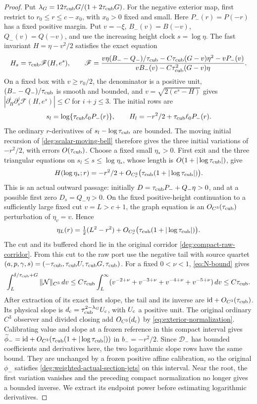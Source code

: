 \begin{proof}
Put \(\lambda_G=12\tau_{\rm cub} G/(1+2\tau_{\rm cub} G)\).
For the negative exterior map, first restrict to
\(r_0\le r\le c-x_0\), with \(x_0>0\) fixed and small.
Here \(P_-(r)=P(-r)\) has a fixed positive margin. Put \(v=-\xi\),
\(B_-(v)=B(-v)\), \(Q_-(v)=Q(-v)\), and use the increasing
height clock \(s=\log\eta\). The fast invariant
\(H=\eta-v^2/2\) satisfies the exact equation
\[
 H_s=\tau_{\rm cub}\mathscr F(H,e^s),\qquad
 \mathscr F=
 \frac{v\eta(B_--Q_-)/\tau_{\rm cub}
       -C\tau_{\rm cub}(G-v)\eta^2-vP_-(v)}
      {vB_-(v)-C\tau_{\rm cub}^2(G-v)\eta}.
\]
On a fixed box with \(v\ge r_0/2\), the denominator is a positive
unit, \((B_--Q_-)/\tau_{\rm cub}\) is smooth and bounded, and
\(v=\sqrt{2(e^s-H)}\) gives
\( |\partial_H^i\partial_s^j\mathscr F(H,e^s)|\le C\)
for \(i+j\le3\). The initial rows are
\[
 s_l=\log\{\tau_{\rm cub}\ell_0P_-(r)\},\qquad
 H_l=-r^2/2+\tau_{\rm cub}\ell_0P_-(r).
\]
The ordinary \(r\)-derivatives of \(s_l-\log\tau_{\rm cub}\) are bounded.
The moving initial recursion of
\eqref{deg:scalar-moving-bell} therefore gives the three initial
variations of \(-r^2/2\), with errors \(O(\tau_{\rm cub})\).
Choose a fixed small \(\eta_*>0\). First exit and the three
triangular equations on
\(s_l\le s\le\log\eta_*\), whose length is
\(O(1+|\log\tau_{\rm cub}|)\), give
\[
 H(\log\eta_*;r)=-r^2/2+
          O_{C^3_r}\bigl(\tau_{\rm cub}(1+|\log\tau_{\rm cub}|)\bigr).
\]
This is an actual outward passage: initially
\(D=\tau_{\rm cub} P_-+Q_-\eta>0\), and at a possible first zero
\(D_s=Q_-\eta>0\). On the fixed positive-height continuation
to a sufficiently large fixed cut \(v=L>c+1\), the graph equation
is an \(O_{C^3}(\tau_{\rm cub})\) perturbation of \(\eta_v=v\). Hence
\[
 \eta_L(r)=\tfrac12(L^2-r^2)+
          O_{C^3_r}\bigl(\tau_{\rm cub}(1+|\log\tau_{\rm cub}|)\bigr).
\]
The cut and its buffered chord lie in the original corridor
\eqref{deg:compact-raw-corridor}. From this cut to the raw port use
the negative tail with source quartet
\((a,p,\gamma,s)=(-\tau_{\rm cub},\tau_{\rm cub} U,\tau_{\rm cub} G,\tau_{\rm cub})\).
For a fixed \(0<\nu<1\), \eqref{eq:N-bound} gives
\[
 \int_L^{\delta/\tau_{\rm cub}+G}\|\mathcal N\|_{C^3}\,dv
 \le C\tau_{\rm cub}\int_L^\infty
 (v^{-2+\nu}+v^{-3+\nu}+v^{-4+\nu}+v^{-5+\nu})\,dv
 \le C\tau_{\rm cub}.
\]
After extraction of its exact first slope, the tail and its inverse
are \(\mathrm{id}+O_{C^3}(\tau_{\rm cub})\). Its physical slope is
\(d_{\rm c}=\tau_{\rm cub}^{2-\lambda_G}U_{\rm c}\), with
\(U_{\rm c}\) a positive unit. The original ordinary \(C^3\)
observer and divided closing add \(O_{C^3}(d_{\rm c})\) by
\eqref{eq:exterior-normalization}. Calibrating value and slope at a
frozen reference in this compact interval gives
\(\widetilde\phi_-=\mathrm{id}+O_{C^3}(\tau_{\rm cub}(1+|\log\tau_{\rm cub}|))\)
in \(b_-=-r^2/2\). Since \(\mathcal D_-\) has bounded coefficients
and derivatives here, the two logarithmic slope rows have the same
bound. They are unchanged by a frozen positive affine calibration,
so the original \(\phi_-\) satisfies
\eqref{deg:weighted-actual-section-jets} on this interval.
Near the root, the first variation vanishes and the preceding compact
normalization no longer gives a bounded inverse. We extract its endpoint
power before estimating logarithmic derivatives.


\end{proof}
